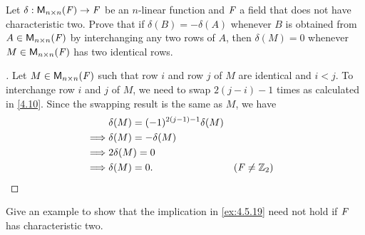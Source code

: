 \begin{ex}\label{ex:4.5.19}
	Let \(\delta : \mathsf{M}_{{n} \times n}({\mathit{F}}) \to \mathit{F}\) be an \(n\)-linear function and \(\mathit{F}\) a field that does not have characteristic two.
	Prove that if \(\delta(B) = -\delta(A)\) whenever \(B\) is obtained from \(A \in \mathsf{M}_{{n} \times n}({\mathit{F}})\) by interchanging any two rows of \(A\), then \(\delta(M) = 0\) whenever \(M \in \mathsf{M}_{{n} \times n}({\mathit{F}})\) has two identical rows.
\end{ex}

\begin{proof}[]
	Let \(M \in \mathsf{M}_{{n} \times n}({\mathit{F}})\) such that row \(i\) and row \(j\) of \(M\) are identical and \(i < j\).
	To interchange row \(i\) and \(j\) of \(M\), we need to swap \(2(j - i) - 1\) times as calculated in \cref{4.10}.
	Since the swapping result is the same as \(M\), we have
	\begin{align*}
		         & \delta(M) = (-1)^{2(j - 1) - 1} \delta(M)                     \\
		\implies & \delta(M) = -\delta(M)                                        \\
		\implies & 2\delta(M) = 0                                                \\
		\implies & \delta(M) = 0.                            &  & (\mathit{F} \neq \mathbb{Z}_2)
	\end{align*}
\end{proof}

\begin{ex}\label{ex:4.5.20}
	Give an example to show that the implication in \cref{ex:4.5.19} need not hold if \(\mathit{F}\) has characteristic two.
\end{ex}

